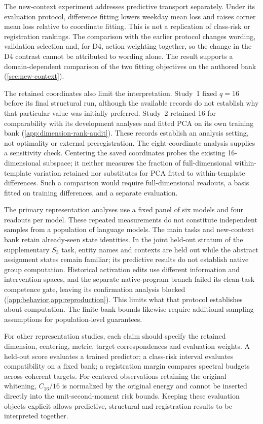 The new-context experiment addresses predictive transport separately.
Under its evaluation protocol, difference fitting lowers weekday mean loss and raises corner mean loss relative to coordinate fitting.
This is not a replication of class-risk or registration rankings.
The comparison with the earlier protocol changes wording, validation selection and, for D4, action weighting together, so the change in the D4 contrast cannot be attributed to wording alone.
The result supports a domain-dependent comparison of the two fitting objectives on the authored bank (\cref{sec:new-context}).

The retained coordinates also limit the interpretation.
Study~1 fixed $q=16$ before its final structural run, although the available records do not establish why that particular value was initially preferred.
Study~2 retained 16 for comparability with its development analyses and fitted PCA on its own training bank (\cref{app:dimension-rank-audit}).
These records establish an analysis setting, not optimality or external preregistration.
The eight-coordinate analysis supplies a sensitivity check.
Centering the saved coordinates probes the existing 16-dimensional subspace; it neither measures the fraction of full-dimensional within-template variation retained nor substitutes for PCA fitted to within-template differences.
Such a comparison would require full-dimensional readouts, a basis fitted on training differences, and a separate evaluation.

The primary representation analyses use a fixed panel of six models and four readouts per model.
These repeated measurements do not constitute independent samples from a population of language models.
The main tasks and new-context bank retain already-seen state identities.
In the joint held-out stratum of the supplementary $S_3$ task, entity names and contexts are held out while the abstract assignment states remain familiar; its predictive results do not establish native group computation.
Historical activation edits use different information and intervention spaces, and the separate native-program branch failed its clean-task competence gate, leaving its confirmation analysis blocked (\cref{app:behavior,app:reproduction}).
This limits what that protocol establishes about computation.
The finite-bank bounds likewise require additional sampling assumptions for population-level guarantees.

For other representation studies, each claim should specify the retained dimension, centering, metric, target correspondences and evaluation weights.
A held-out score evaluates a trained predictor; a class-risk interval evaluates compatibility on a fixed bank; a registration margin compares spectral budgets across coherent targets.
For centered observations retaining the original whitening, $C_{16}/16$ is normalized by the original energy and cannot be inserted directly into the unit-second-moment risk bounds.
Keeping these evaluation objects explicit allows predictive, structural and registration results to be interpreted together.

